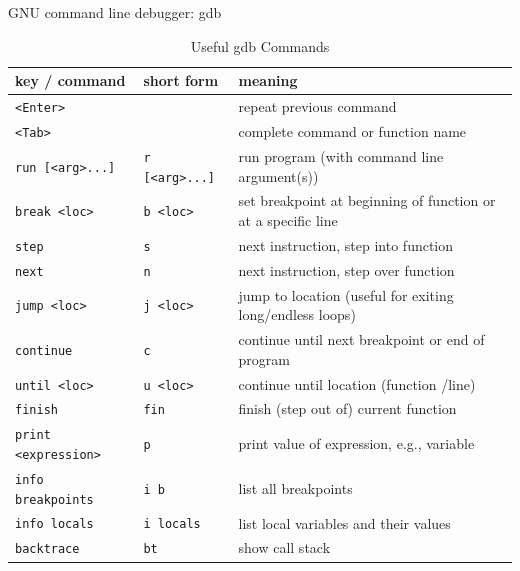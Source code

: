 \documentclass[aspectratio=1610]{beamer}
\begin{document}
	\begin{frame}[fragile]{GNU command line debugger: gdb}
		\begin{block}{}
			\begin{table}[h!]
				\small
				\centering
				\begin{tabular}{|l|l|p{7.5cm}|}
					\hline
					\textbf{key / command}      & \textbf{short form} & \textbf{meaning}                                  \\ \hline
					\texttt{<Enter>}            &                     & repeat previous command                           \\ \hline
					\texttt{<Tab>}              &                     & complete command or function name                \\ \hline
					\texttt{run [<arg>...]}     & \texttt{r [<arg>...]} & run program (with command line argument(s))       \\ \hline
					\texttt{break <loc>}        & \texttt{b <loc>}    & set breakpoint at beginning of function or at a specific line \\ \hline
					\texttt{step}               & \texttt{s}          & next instruction, step into function             \\ \hline
					\texttt{next}               & \texttt{n}          & next instruction, step over function             \\ \hline
					\texttt{jump <loc>}         & \texttt{j <loc>}    & jump to location (useful for exiting long/endless loops) \\ \hline
					\texttt{continue}           & \texttt{c}          & continue until next breakpoint or end of program \\ \hline
					\texttt{until <loc>}        & \texttt{u <loc>}    & continue until location (function /line)         \\ \hline
					\texttt{finish}             & \texttt{fin}        & finish (step out of) current function            \\ \hline
					\texttt{print <expression>} & \texttt{p}          & print value of expression, e.g., variable        \\ \hline
					\texttt{info breakpoints}   & \texttt{i b}        & list all breakpoints                             \\ \hline
					\texttt{info locals}        & \texttt{i locals}   & list local variables and their values            \\ \hline
					\texttt{backtrace}          & \texttt{bt}         & show call stack                                  \\ \hline
				\end{tabular}
				\caption{Useful gdb Commands}
				\label{table:gdb_commands}
				\vspace{-0.5cm}
			\end{table}
		\end{block}
	\end{frame}
	
\end{document}
